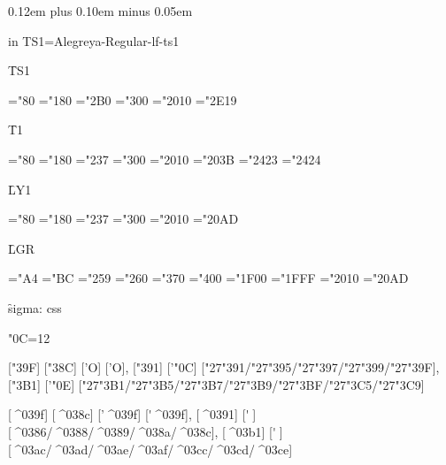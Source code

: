 \TextH


\vfil
\eject
\spaceskip 0.12em plus 0.10em minus 0.05em

\font in TS1\TSoneZZZSerifRegular=Alegreya-Regular-lf-ts1

{\f TS1}

\TSoneZZZSerifRegular
\ChrA="80 \ChrB="180
\PrintCode
\ChrA="2B0 \ChrB="300
\PrintCode
\ChrA="2010 \ChrB="2E19
\PrintCode

{\f T1}

\ToneZZZSerifRegular
\ChrA="80 \ChrB="180
\PrintCode
\ChrA="237 \ChrB="300
\PrintCode
\ChrA="2010 \ChrB="203B
\PrintCode
\ChrA="2423 \ChrB="2424
\PrintCode

{\f LY1}

\LYoneZZZSerifRegular
\ChrA="80 \ChrB="180
\PrintCode
\ChrA="237 \ChrB="300
\PrintCode
\ChrA="2010 \ChrB="20AD
\PrintCode

{\f LGR}

\LgrZZZSerifRegular
\ChrA="A4 \ChrB="BC
\PrintCode
\ChrA="259 \ChrB="260
\PrintCode
\ChrA="370 \ChrB="400
\PrintCode
\ChrA="1F00 \ChrB="1FFF
\PrintCode
\ChrA="2010 \ChrB="20AD
\PrintCode

{\f sigma:} ^^63^^73^^73

\catcode"0C=12

[\char"39F] [\char"38C] ['\relax Ο] ['Ο],
[\char"391] ['\char"0C] [\char"27\char"391/\char"27\char"395/\char"27\char"397/\char"27\char"399/\char"27\char"39F],
[\char"3B1] ['\char"0E] [\char"27\char"3B1/\char"27\char"3B5/\char"27\char"3B7/\char"27\char"3B9/\char"27\char"3BF/\char"27\char"3C5/\char"27\char"3C9]

[^^^^039f] [^^^^038c] ['\relax ^^^^039f] [^^27^^^^039f],
[^^^^0391] [^^27^^0c] [^^^^0386/^^^^0388/^^^^0389/^^^^038a/^^^^038c],
[^^^^03b1] [^^27^^0e] [^^^^03ac/^^^^03ad/^^^^03ae/^^^^03af/^^^^03cc/^^^^03cd/^^^^03ce]

\bye
